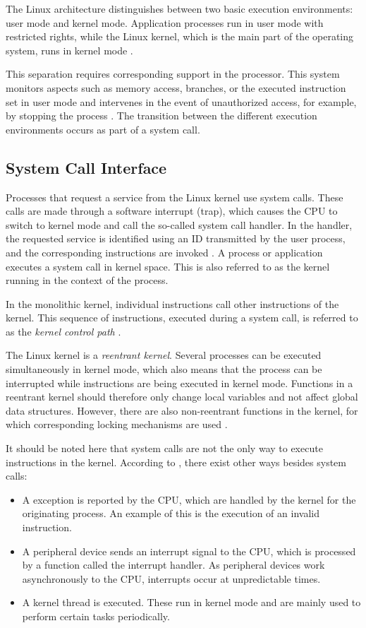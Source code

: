 The Linux architecture distinguishes between two basic execution environments: user mode and kernel mode. Application processes run in user mode with restricted rights, while the Linux kernel, which is the main part of the operating system, runs in kernel mode \cite{like02}.

This separation requires corresponding support in the processor. This system monitors aspects such as memory access, branches, or the executed instruction set in user mode and intervenes in the event of unauthorized access, for example, by stopping the process \cite{like06}. The transition between the different execution environments occurs as part of a system call.


\subsection{System Call Interface}

Processes that request a service from the Linux kernel use system calls. These calls are made through a software interrupt (trap), which causes the \ac{CPU} to switch to kernel mode and call the so-called system call handler. In the handler, the requested service is identified using an ID transmitted by the user process, and the corresponding instructions are invoked \cite{like02}. A process or application executes a system call in kernel space. This is also referred to as the kernel running in the context of the process.

In the monolithic kernel, individual instructions call other instructions of the kernel.  This sequence of instructions, executed during a system call, is referred to as the \textit{kernel control path} \cite{like07}.

The Linux kernel is a \textit{reentrant kernel}. Several processes can be executed simultaneously in kernel mode, which also means that the process can be interrupted while instructions are being executed in kernel mode. Functions in a reentrant kernel should therefore only change local variables and not affect global data structures. However, there are also non-reentrant functions in the kernel, for which corresponding locking mechanisms are used \cite{like02}.

It should be noted here that system calls are not the only way to execute instructions in the kernel. According to \cite{like02}, there exist other ways besides system calls:

\begin{itemize}
\item A exception is reported by the \ac{CPU}, which are handled by the kernel for the originating process. An example of this is the execution of an invalid instruction.
\item A peripheral device sends an interrupt signal to the \ac{CPU}, which is processed by a function called the interrupt handler. As peripheral devices work asynchronously to the \ac{CPU}, interrupts occur at unpredictable times.
\item A kernel thread is executed. These run in kernel mode and are mainly used to perform certain tasks periodically.
\end{itemize}


